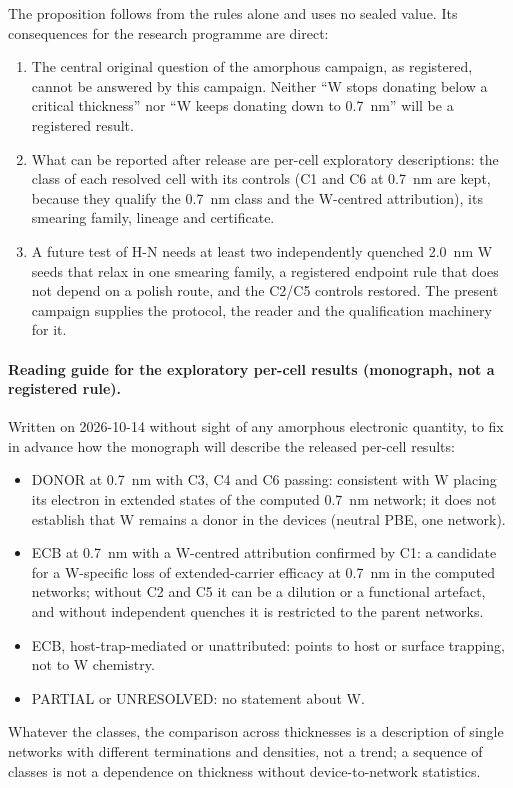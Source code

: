 The proposition follows from the rules alone and uses no sealed value. Its consequences for the research programme are
direct:
\begin{enumerate}
\item The central original question of the amorphous campaign, as registered, cannot be answered by this campaign.
Neither ``W stops donating below a critical thickness'' nor ``W keeps donating down to 0.7~nm'' will be a registered
result.
\item What can be reported after release are per-cell exploratory descriptions: the class of each resolved cell with
its controls (C1 and C6 at 0.7~nm are kept, because they qualify the 0.7~nm class and the W-centred attribution), its
smearing family, lineage and certificate.
\item A future test of H-N needs at least two independently quenched 2.0~nm W seeds that relax in one smearing family,
a registered endpoint rule that does not depend on a polish route, and the C2/C5 controls restored. The present
campaign supplies the protocol, the reader and the qualification machinery for it.
\end{enumerate}

\paragraph{Reading guide for the exploratory per-cell results (monograph, not a registered rule).} Written on
2026-10-14 without sight of any amorphous electronic quantity, to fix in advance how the monograph will describe the
released per-cell results:
\begin{itemize}
\item DONOR at 0.7~nm with C3, C4 and C6 passing: consistent with W placing its electron in extended states of the
computed 0.7~nm network; it does not establish that W remains a donor in the devices (neutral PBE, one network).
\item ECB at 0.7~nm with a W-centred attribution confirmed by C1: a candidate for a W-specific loss of
extended-carrier efficacy at 0.7~nm in the computed networks; without C2 and C5 it can be a dilution or a functional
artefact, and without independent quenches it is restricted to the parent networks.
\item ECB, host-trap-mediated or unattributed: points to host or surface trapping, not to W chemistry.
\item PARTIAL or UNRESOLVED: no statement about W.
\end{itemize}
Whatever the classes, the comparison across thicknesses is a description of single networks with different
terminations and densities, not a trend; a sequence of classes is not a dependence on thickness without device-to-network
statistics.

